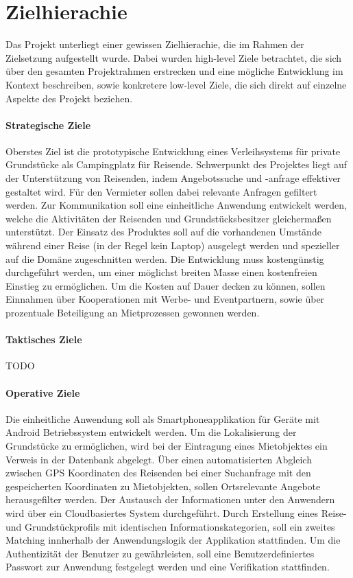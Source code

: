 
\chapter{Zielhierachie}
Das Projekt unterliegt einer gewissen Zielhierachie, die im Rahmen der Zielsetzung aufgestellt wurde. Dabei wurden high-level Ziele betrachtet, die sich über den gesamten Projektrahmen erstrecken und eine mögliche Entwicklung im Kontext beschreiben, sowie konkretere low-level Ziele, die sich direkt auf einzelne Aspekte des Projekt beziehen.

\subsubsection{Strategische Ziele}
Oberstes Ziel ist die prototypische Entwicklung eines Verleihsystems für private Grundstücke als Campingplatz für Reisende. Schwerpunkt des Projektes liegt auf der Unterstützung von Reisenden, indem Angebotssuche und -anfrage effektiver gestaltet wird. Für den Vermieter sollen dabei relevante Anfragen gefiltert werden. Zur Kommunikation soll eine einheitliche Anwendung entwickelt werden, welche die Aktivitäten der Reisenden und Grundstücksbesitzer gleichermaßen unterstützt. Der Einsatz des Produktes soll auf die vorhandenen Umstände während einer Reise (in der Regel kein Laptop) ausgelegt werden und spezieller auf die Domäne zugeschnitten werden. 
Die Entwicklung muss kostengünstig durchgeführt werden, um einer möglichst breiten Masse einen kostenfreien Einstieg zu ermöglichen. Um die Kosten auf Dauer decken zu können, sollen Einnahmen über Kooperationen mit Werbe- und Eventpartnern, sowie über prozentuale Beteiligung an Mietprozessen gewonnen werden.

\subsubsection{Taktisches Ziele}
TODO

\subsubsection{Operative Ziele}
Die einheitliche Anwendung soll als Smartphoneapplikation für Geräte mit Android Betriebssystem entwickelt werden. Um die Lokalisierung der Grundstücke zu ermöglichen, wird bei der Eintragung eines Mietobjektes ein Verweis in der Datenbank abgelegt. Über einen automatisierten Abgleich zwischen GPS Koordinaten des Reisenden bei einer Suchanfrage mit den gespeicherten Koordinaten zu Mietobjekten, sollen Ortsrelevante Angebote herausgefilter werden. Der Austausch der Informationen unter den Anwendern wird über ein Cloudbasiertes System durchgeführt.
Durch Erstellung eines Reise- und Grundstückprofils mit identischen Informationskategorien, soll ein zweites Matching innherhalb der Anwendungslogik der Applikation stattfinden. Um die Authentizität der Benutzer zu gewährleisten, soll eine Benutzerdefiniertes Passwort zur Anwendung festgelegt werden und eine Verifikation stattfinden.

